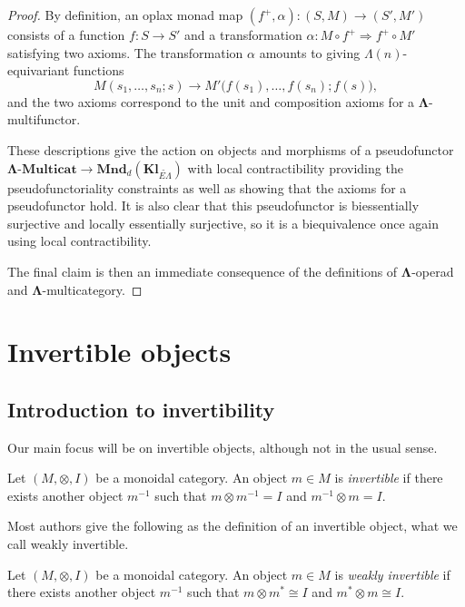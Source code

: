 \documentclass{amsbook} %
\newcommand{\mb}{\mathbf}
\numberwithin{section}{chapter}
\begin{document}
\begin{proof}
By definition, an oplax monad map $(f^{+}, \alpha): (S,M) \to (S', M')$ consists of a function $f:S \to S'$ and a transformation $\alpha: M \circ f^{+} \Rightarrow f^{+} \circ M'$ satisfying two axioms.  The transformation $\alpha$ amounts to giving $\Lambda(n)$-equivariant functions
\[
M(s_1, \ldots, s_n; s) \to M'\big(f(s_1), \ldots, f(s_n); f(s)\big),
\]
and the two axioms correspond to the unit and composition axioms for a $\mb{\Lambda}$-multifunctor.

These descriptions give the action on objects and morphisms of a pseudofunctor $\mb{\Lambda}\mbox{-}\mb{Multicat} \to \mb{Mnd}_{d}(\mb{Kl}_{\widetilde{E\Lambda}})$ with local contractibility providing the pseudofunctoriality constraints as well as showing that the axioms for a pseudofunctor hold.  It is also clear that this pseudofunctor is biessentially surjective and locally essentially surjective, so it is a biequivalence once again using local contractibility.

The final claim is then an immediate consequence of the definitions of $\mb{\Lambda}$-operad and $\mb{\Lambda}$-multicategory.
\end{proof}




\chapter{Invertible objects}

\section{Introduction to invertibility}

Our main focus will be on invertible objects, although not in the usual sense.
\begin{Defi}
Let $(M, \otimes, I)$ be a monoidal category. An object $m \in M$ is \emph{invertible} if there exists another object $m^{-1}$ such that $m \otimes m^{-1} = I$ and $m^{-1} \otimes m = I$.

\end{Defi}

Most authors give the following as the definition of an invertible object, what we call weakly invertible.
\begin{Defi}
Let $(M, \otimes, I)$ be a monoidal category. An object $m \in M$ is \emph{weakly invertible} if there exists another object $m^{-1}$ such that $m \otimes m^{*} \cong I$ and $m^{*} \otimes m \cong I$.

\end{Defi}
\end{document}
